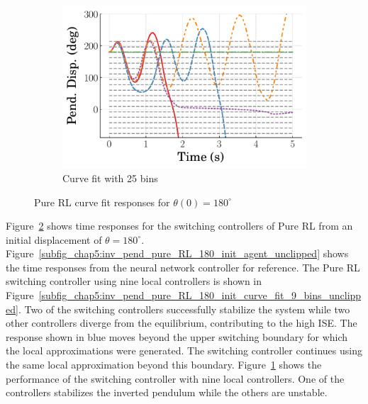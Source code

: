 \begin{figure}
\begin{subfigure}[b]{0.32\textwidth}
    \end{subfigure}
    \hfill
    \begin{subfigure}[b]{0.32\textwidth}
        \centering
        \includegraphics[width=\textwidth]{figures/figures_Interpretability/Mean_ISE_Inverted_Pendulum-v0_cubic_25_bins/Curve_fit_time_responses/pure_RL/curve_fit_Pend_Disp_180.pdf}
        \caption{Curve fit with 25 bins}
        \label{subfig_chap5:inv_pend_pure_RL_180_init_curve_fit_25_bins_unclipped}
    \end{subfigure}
    \hfill
    \caption{Pure RL curve fit responses for $\theta(0)=180^\circ$}
    \label{fig_chap5:inv_pend_pure_RL_180_init_unclipped}
\end{figure}
%

Figure~\ref{fig_chap5:inv_pend_pure_RL_180_init_unclipped} shows time responses for the switching controllers of Pure RL from an initial displacement of $\theta=180^\circ$. Figure~\ref{subfig_chap5:inv_pend_pure_RL_180_init_agent_unclipped} shows the time responses from the neural network controller for reference. The Pure RL switching controller using nine local controllers is shown in Figure~\ref{subfig_chap5:inv_pend_pure_RL_180_init_curve_fit_9_bins_unclipped}. Two of the switching controllers successfully stabilize the system while two other controllers diverge from the equilibrium, contributing to the high ISE. The response shown in blue moves beyond the upper switching boundary for which the local approximations were generated. The switching controller continues using the same local approximation beyond this boundary. Figure~\ref{subfig_chap5:inv_pend_pure_RL_180_init_curve_fit_25_bins_unclipped} shows the performance of the switching controller with nine local controllers. One of the controllers stabilizes the inverted pendulum while the others are unstable.

